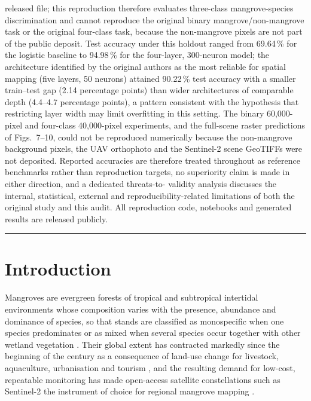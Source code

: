 \documentclass[10pt,twocolumn,a4paper]{article}
\begin{document}
{\begin{minipage}[t]{0.72\textwidth}
released file; this reproduction therefore evaluates three-class mangrove-species discrimination
and cannot reproduce the original binary mangrove/non-mangrove task or the original four-class
task, because the non-mangrove pixels are not part of the public deposit. Test accuracy under this
holdout ranged from 69.64\,\% for the logistic baseline to 94.98\,\% for the four-layer,
300-neuron model; the architecture identified by the original authors as the most reliable for
spatial mapping (five layers, 50 neurons) attained 90.22\,\% test accuracy with a smaller
train--test gap (2.14 percentage points) than wider architectures of comparable depth (4.4--4.7
percentage points), a pattern consistent with the hypothesis that restricting layer width may limit
overfitting in this setting. The binary 60{,}000-pixel and four-class 40{,}000-pixel experiments,
and the full-scene raster predictions of Figs.~7--10, could not be reproduced numerically because
the non-mangrove background pixels, the UAV orthophoto and the Sentinel-2 scene GeoTIFFs were not
deposited. Reported accuracies are therefore treated throughout as reference benchmarks rather than
reproduction targets, no superiority claim is made in either direction, and a dedicated threats-to-
validity analysis discusses the internal, statistical, external and reproducibility-related
limitations of both the original study and this audit. All reproduction code, notebooks and
generated results are released publicly.
\end{minipage}

\vspace{8pt}
\noindent\rule{\textwidth}{0.4pt}
\vspace{14pt}
}

\twocolumn[\begin{@twocolumnfalse}\FrontMatterBlock\end{@twocolumnfalse}]


\renewcommand{\thefootnote}{}
\renewcommand{\thefootnote}{\arabic{footnote}}

\section{Introduction}
\label{sec:intro}

Mangroves are evergreen forests of tropical and subtropical intertidal environments whose
composition varies with the presence, abundance and dominance of species, so that stands are
classified as monospecific when one species predominates or as mixed when several species occur
together with other wetland vegetation \citep{fao2023}. Their global extent has contracted
markedly since the beginning of the century as a consequence of land-use change for livestock,
aquaculture, urbanisation and tourism \citep{morenocasasola2002}, and the resulting demand for
low-cost, repeatable monitoring has made open-access satellite constellations such as Sentinel-2
the instrument of choice for regional mangrove mapping \citep{chopade2023,pham2019}.
\end{document}
